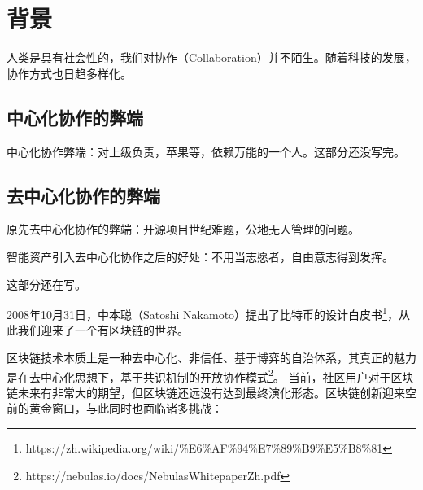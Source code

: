 \section{背景}

人类是具有社会性的，我们对协作（Collaboration）并不陌生。随着科技的发展，协作方式也日趋多样化。

\subsection{中心化协作的弊端}

中心化协作弊端：对上级负责，苹果等，依赖万能的一个人。这部分还没写完。

\subsection{去中心化协作的弊端}

原先去中心化协作的弊端：开源项目世纪难题，公地无人管理的问题。

智能资产引入去中心化协作之后的好处：不用当志愿者，自由意志得到发挥。

这部分还在写。

2008年10⽉31⽇，中本聪（Satoshi Nakamoto）提出了⽐特币的设计⽩皮书\footnote{https://zh.wikipedia.org/wiki/\%E6\%AF\%94\%E7\%89\%B9\%E5\%B8\%81}，从此我们迎来了一个有区块链的世界。

区块链技术本质上是⼀种去中心化、⾮信任、基于博弈的⾃治体系，其真正的魅力是在去中⼼化思想下，基于共识机制的开放协作模式\footnote{https://nebulas.io/docs/NebulasWhitepaperZh.pdf}。
当前，社区⽤户对于区块链未来有⾮常大的期望，但区块链还远没有达到最终演化形态。区块链创新迎来空前的黄金窗口，与此同时也面临诸多挑战：

